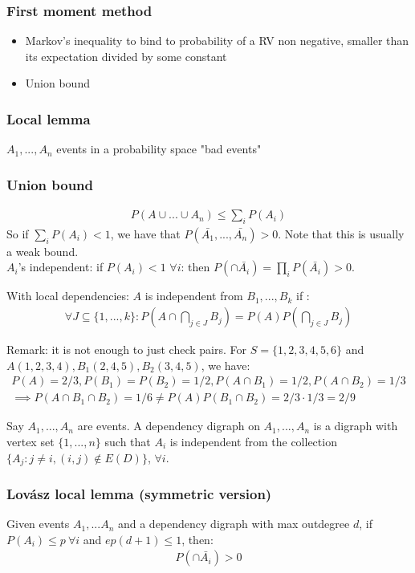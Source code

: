 \subsubsection{First moment method} 
\begin{itemize}
	\item Markov's inequality to bind to probability of a RV non negative, smaller than its expectation divided by some constant
	\item Union bound	
\end{itemize}


\subsubsection{Local lemma}
$A_1, ..., A_n$ events in a probability space "bad events"
\subsubsection{Union bound}
\begin{eqnarray}
	P(A \cup ... \cup A_n) \leq \sum_i P(A_i)
\end{eqnarray}
So if $\sum_i P(A_i) < 1$, we have that $P(\bar{A_1}, ..., \bar{A_n}) > 0$. Note that this is usually a weak bound.\\

$A_i$'s independent: if $P(A_i) < 1$ $\forall i$: then $P(\cap \bar{A_i}) = \prod_i P(\bar{A_i}) > 0$.

With local dependencies: $A$ is independent from $B_1, ..., B_k$ if :
\begin{eqnarray}
	\forall J \subseteq \{1,...,k\} : P(A \cap \bigcap_{j \in J} B_j) = P(A) P(\bigcap_{j \in J}B_j)
\end{eqnarray}

Remark: it is not enough to just check pairs. For $S = \{1,2,3,4,5,6\}$ and $A(1,2,3,4), B_1(2,4,5), B_2(3,4,5)$, we have:
\begin{eqnarray}
	P(A) = 2/3, P(B_1) = P(B_2) = 1/2, P(A \cap B_1) = 1/2, P(A \cap B_2) = 1/3\\
	\implies P(A \cap B_1 \cap B_2) = 1/6 \neq P(A) P(B_1 \cap B_2) = 2/3 \cdot 1/3 = 2/9 
\end{eqnarray}

Say $A_1, ..., A_n$ are events. A dependency digraph on $A_1, ..., A_n$ is a digraph with vertex set $\{ 1, ..., n \}$ such that $A_i$ is independent from the collection $\{ A_j : j \neq i, (i,j) \notin E(D) \}$, $\forall i$.

\subsubsection{Lovász local lemma (symmetric version)}
Given events $A_1,...A_n$ and a dependency digraph with max outdegree $d$, if $P(A_i) \leq p ~ \forall i$ and $ep(d+1) \leq 1$, then:
\begin{eqnarray}
	P(\cap \bar{A_i}) > 0
\end{eqnarray}


